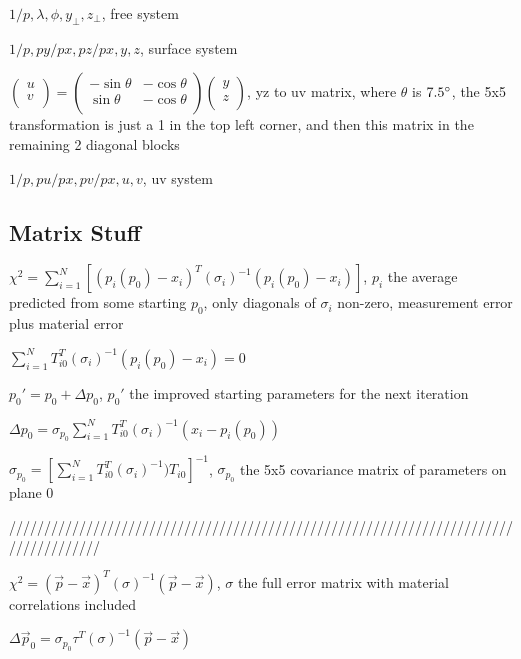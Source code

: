 \documentclass{article}
\begin{document}
$1/p, \lambda, \phi, y_{\perp}, z_{\perp}$, free system

$1/p, py/px, pz/px, y, z$, surface system

$
\begin{pmatrix}
u \\
v \\
\end{pmatrix} =
\begin{pmatrix}
-\sin{\theta} & -\cos{\theta} \\
\sin{\theta} & -\cos{\theta}\\
\end{pmatrix}
\begin{pmatrix}
y \\
z \\
\end{pmatrix}
$, yz to uv matrix, where $\theta$ is $7.5\degree$, the 5x5 transformation is just a 1 in the top left corner, and then this matrix in the remaining 2 diagonal blocks

$1/p, pu/px, pv/px, u, v$, uv system


\subsection{Matrix Stuff}


$\chi^2 = \sum_{i=1}^{N} [(p_{i}(p_{0})-x_{i})^{T}(\sigma_{i})^{-1}(p_{i}(p_{0})-x_{i})]$, $p_{i}$ the average predicted from some starting $p_{0}$, only diagonals of $\sigma_{i}$ non-zero, measurement error plus material error

$\sum_{i=1}^{N} T^{T}_{i0}(\sigma_{i})^{-1}(p_{i}(p_{0})-x_{i}) = 0$

$p_{0}' = p_{0} + \Delta p_{0}$, $p_{0}'$ the improved starting parameters for the next iteration

$\Delta p_{0} = \sigma_{p_{0}} \sum_{i=1}^{N} T^{T}_{i0}(\sigma_{i})^{-1}(x_{i} - p_{i}(p_{0}))$

$\sigma_{p_{0}} = [\sum_{i=1}^{N} T^{T}_{i0} (\sigma_{i})^{-1}) T_{i0} ]^{-1}$, $\sigma_{p_{0}}$ the 5x5 covariance matrix of parameters on plane 0

/////////////////////////////////////////////////////////////////////////////////////

$\chi^2 = (\vec{p}-\vec{x})^{T} (\sigma)^{-1} (\vec{p}-\vec{x})$, $\sigma$ the full error matrix with material correlations included

$\Delta \vec{p}_{0} = \sigma_{p_{0}} \tau^{T}(\sigma)^{-1}(\vec{p}-\vec{x})$
\end{document}
